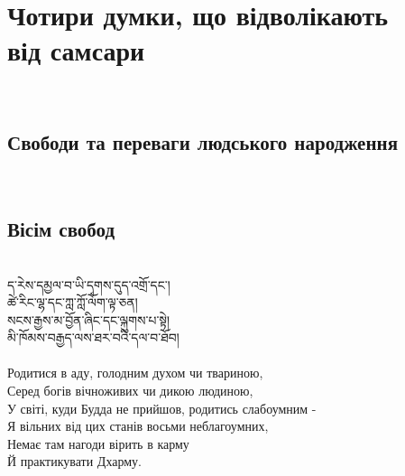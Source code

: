 \newpage
\section{Чотири думки, що відволікають \\ від самсари}
\\
\subsection{Свободи та переваги людського народження}
\\
\subsection*{Вісім свобод}
\\
\ti
ད་རེས་དམྱལ་བ་ཡི་དྭགས་དུད་འགྲོ་དང༌།\\
ཚེ་རིང་ལྷ་དང་ཀླ་ཀློ་ལོག་ལྟ་ཅན།\\
སངས་རྒྱས་མ་བྱོན་ཞིང་དང་ལྐུགས་པ་སྟེ།\\
མི་ཁོམས་བརྒྱད་ལས་ཐར་བའི་དལ་བ་ཐོབ།\\
\\
\ru
Родитися в аду, голодним духом чи твариною,\\
Серед богів вічноживих чи дикою людиною,\\
У світі, куди Будда не прийшов, родитись слабоумним -\\
Я вільних від цих станів восьми неблагоумних,\\
Немає там нагоди вірить в карму\\
Й практикувати Дхарму.\\

\newpage
